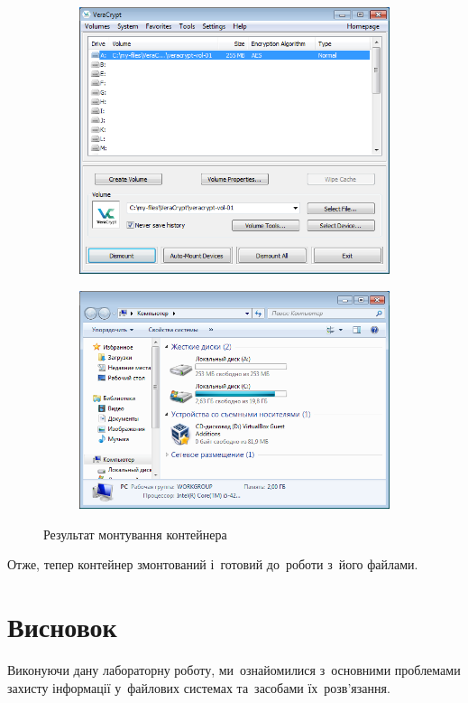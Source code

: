 \documentclass[
	a4paper,
	oneside,
	BCOR = 10mm,
	DIV = 12,
	12pt,
	headings = normal,
]{scrartcl}
\newlength{\gridunitwidth}
\begin{document}
		\begin{figure}[!htbp]
			\begin{subfigure}[b]{6\gridunitwidth - 1em / 2}
				\centering
				\includegraphics[width = \columnwidth]{./assets/15.png}
				\caption{}
				\label{subfig:vc-res-vc}
			\end{subfigure}%
			\hspace{1em}%
			\begin{subfigure}[b]{6\gridunitwidth - 1em / 2}
				\centering
				\includegraphics[width = \columnwidth]{./assets/16.png}
				\caption{}
				\label{subfig:vc-res-explorer}
			\end{subfigure}
			\caption{Результат монтування контейнера}
			\label{fig:vc-res}
		\end{figure}

		Отже, тепер контейнер змонтований і~готовий до~роботи з~його файлами.

	\section{Висновок}
		Виконуючи дану лабораторну роботу, ми~ознайомилися з~основними проблемами захисту інформації у~файлових системах та~засобами їх~розв’язання.
\end{document}
